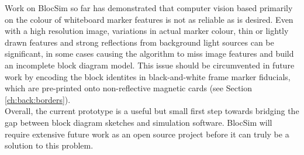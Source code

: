 Work on BlocSim so far has demonstrated that computer vision based primarily on the colour of whiteboard marker features is not as reliable as is desired. Even with a high resolution image, variations in actual marker colour, thin or lightly drawn features and strong reflections from background light sources can be significant, in some cases causing the algorithm to miss image features and build an incomplete block diagram model. This issue should be circumvented in future work by encoding the block identites in black-and-white frame marker fiducials, which are pre-printed onto non-reflective magnetic cards (see Section \ref{ch:back:borders}).
\\

Overall, the current prototype is a useful but small first step towards bridging the gap between block diagram sketches and simulation software. BlocSim will require extensive future work as an open source project before it can truly be a solution to this problem.


\begin{comment}

\end{comment}
